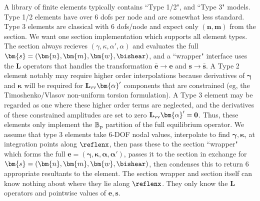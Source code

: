 A library of finite elements typically contains ``Type 1/2", and ``Type 3" models. 
Type 1/2 elements have over 6 dofs per node and are somewhat less standard. 
Type 3 elements are classical with 6 dofs/node and expect only $(\bm{n},\bm{m})$ from the section. 
We want one section implementation which supports all element types. 
The section always recieves \((\gamma,\kappa,\alpha',\alpha)\) and evaluates the full $\bm{s} = (\bm{n},\bm{m},\bm{w},\bishear)$, and a ``wrapper" interface uses the $\mathbf{L}$ operators that handles the transformation $\bar{\bm e}\rightarrow\bm{e}$ and $\bm{s}\rightarrow\bar{\bm s}$. 
A Type 2 element notably may require higher order interpolations because derivatives of \(\bm{\gamma}\) and \(\bm{\kappa}\) will be required for \(\mathbf{L}_{\rm vv}\bm{\alpha}'\) components that are constrained (eg, the Timoshenko/Vlasov non-uniform torsion formulation).
A Type 3 element may be regarded as one where these higher order terms are neglected, and the derivatives of these constrained amplitudes are set to zero \(\mathbf{L}_{\rm vv}\bm{\alpha}' = \mathbf{0}\).
Thus, these elements only implement the $\mathbb{B}_{\rm p}$ partition of the full equilibrium operator. 
We assume that type 3 elements take 6-DOF nodal values, interpolate to find $\bm\gamma,\bm\kappa$, at integration points along $\reflenx$, then pass these to the section ``wrapper" which forms the full $\bm{e} = (\bm\gamma,\bm\kappa,\bm\alpha,\bm\alpha')$, passes it to the section in exchange for $\bm{s} = (\bm{n},\bm{m},\bm{w},\bishear)$, then condenses this to return 6 appropriate resultants to the element. 
The section wrapper and section itself can know nothing about where they lie along $\reflenx$. 
They only know the $\mathbf{L}$ operators and pointwise values of $\bm{e},\bm{s}$.

